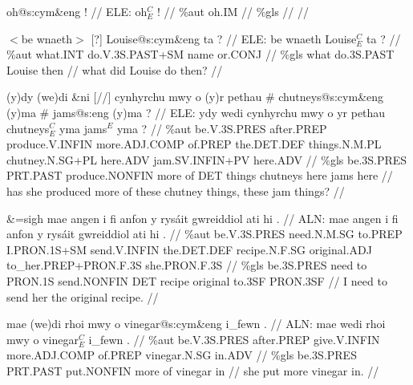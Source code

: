 \documentclass[a4paper,10pt]{article}
\begin{document}
\ex
\begingl[lingstyle=gergl]
\glchat oh@s:cym\&eng ! //
\glsurface ELE:  oh$^{C}_{E}$ !  //
\glauto \%aut  oh{\scriptsize .IM}   //
\glmanual \%gls     //
\gleng  //
\endgl
\xe

\ex
\begingl[lingstyle=gergl]
\glchat $<$be wnaeth$>$ [?] Louise@s:cym\&eng ta ? //
\glsurface ELE:  be wnaeth Louise$^{C}_{E}$ ta ?  //
\glauto \%aut  what{\scriptsize .INT} do{\scriptsize .V.3S.PAST+SM} name or{\scriptsize .CONJ}   //
\glmanual \%gls  what do{\scriptsize .3S.PAST} Louise then   //
\gleng what did Louise do then? //
\endgl
\xe

\ex
\begingl[lingstyle=gergl]
\glchat (y)dy (we)di \&ni [//] cynhyrchu mwy o (y)r pethau \# chutneys@s:cym\&eng (y)ma \# jams@s:eng (y)ma ? //
\glsurface ELE:  ydy wedi cynhyrchu mwy o yr pethau chutneys$^{C}_{E}$ yma jams$^{E}$ yma ?  //
\glauto \%aut  be{\scriptsize .V.3S.PRES} after{\scriptsize .PREP} produce{\scriptsize .V.INFIN} more{\scriptsize .ADJ.COMP} of{\scriptsize .PREP} the{\scriptsize .DET.DEF} things{\scriptsize .N.M.PL} chutney{\scriptsize .N.SG+PL} here{\scriptsize .ADV} jam{\scriptsize .SV.INFIN+PV} here{\scriptsize .ADV}   //
\glmanual \%gls  be{\scriptsize .3S.PRES} PRT{\scriptsize .PAST} produce{\scriptsize .NONFIN} more of DET things chutneys here jams here   //
\gleng has she produced more of these chutney things, these jam things? //
\endgl
\xe

\ex
\begingl[lingstyle=gergl]
\glchat \&=sigh mae angen i fi anfon y rysáit gwreiddiol ati hi . //
\glsurface ALN:  mae angen i fi anfon y rysáit gwreiddiol ati hi .  //
\glauto \%aut  be{\scriptsize .V.3S.PRES} need{\scriptsize .N.M.SG} to{\scriptsize .PREP} I{\scriptsize .PRON.1S+SM} send{\scriptsize .V.INFIN} the{\scriptsize .DET.DEF} recipe{\scriptsize .N.F.SG} original{\scriptsize .ADJ} to\_her{\scriptsize .PREP+PRON.F.3S} she{\scriptsize .PRON.F.3S}   //
\glmanual \%gls  be{\scriptsize .3S.PRES} need to PRON{\scriptsize .1S} send{\scriptsize .NONFIN} DET recipe original to{\scriptsize .3SF} PRON{\scriptsize .3SF}   //
\gleng I need to send her the original recipe. //
\endgl
\xe

\ex
\begingl[lingstyle=gergl]
\glchat mae (we)di rhoi mwy o vinegar@s:cym\&eng i\_fewn . //
\glsurface ALN:  mae wedi rhoi mwy o vinegar$^{C}_{E}$ i\_fewn .  //
\glauto \%aut  be{\scriptsize .V.3S.PRES} after{\scriptsize .PREP} give{\scriptsize .V.INFIN} more{\scriptsize .ADJ.COMP} of{\scriptsize .PREP} vinegar{\scriptsize .N.SG} in{\scriptsize .ADV}   //
\glmanual \%gls  be{\scriptsize .3S.PRES} PRT{\scriptsize .PAST} put{\scriptsize .NONFIN} more of vinegar in   //
\gleng she put more vinegar in. //
\endgl
\xe
\end{document}
